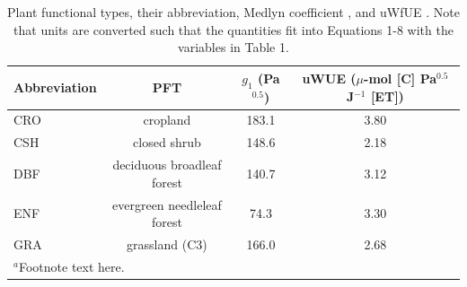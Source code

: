\documentclass[draft,linenumbers]{agujournal}
\begin{document}
\begin{table}
\caption{Plant functional types, their abbreviation, Medlyn coefficient \citep[from ][]{Lin_2015}, and uWfUE \citep[from ][]{Zhou_2015}. Note that units are converted such that the quantities fit into Equations 1-8 with the variables in Table 1.}
\centering
\begin{tabular}{l c c c}
  \hline
  Abbreviation & PFT & $g_1$ (Pa$^{0.5}$) & uWUE ($\mu$-mol [C] Pa$^{0.5}$ J$^{-1}$ [ET])  \\
  \hline
  CRO & cropland & 183.1 & 3.80 \\
  CSH & closed shrub & 148.6 & 2.18 \\
  DBF & deciduous broadleaf forest & 140.7 & 3.12 \\
  ENF & evergreen needleleaf forest & 74.3 & 3.30 \\
  GRA & grassland (C3) & 166.0 & 2.68 \\
\hline
\multicolumn{2}{l}{$^{a}$Footnote text here.}
\end{tabular}
\end{table}
\end{document}
